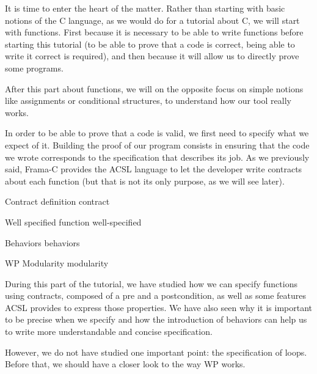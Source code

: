 It is time to enter the heart of the matter. Rather than starting with
basic notions of the C language, as we would do for a tutorial about C,
we will start with functions. First because it is necessary to be able
to write functions before starting this tutorial (to be able to prove
that a code is correct, being able to write it correct is required), and
then because it will allow us to directly prove some programs.



After this part about functions, we will on the opposite focus on simple
notions like assignments or conditional structures, to understand how our
tool really works.



In order to be able to prove that a code is valid, we first need to
specify what we expect of it. Building the proof of our program consists
in ensuring that the code we wrote corresponds to the specification that
describes its job. As we previously said, Frama-C provides the ACSL
language to let the developer write contracts about each function (but
that is not its only purpose, as we will see later).



\begin{levelTwo}
  {Contract definition}
  {contract}
\end{levelTwo}

\begin{levelTwo}
  {Well specified function}
  {well-specified}
\end{levelTwo}

\begin{levelTwo}
  {Behaviors}
  {behaviors}
\end{levelTwo}

\begin{levelTwo}
  {WP Modularity}
  {modularity}
\end{levelTwo}


\horizontalLine
\newpage


During this part of the tutorial, we have studied how we can specify
functions using contracts, composed of a pre and a postcondition, as
well as some features ACSL provides to express those properties. We have
also seen why it is important to be precise when we specify and how the
introduction of behaviors can help us to write more understandable and
concise specification.

However, we do not have studied one important point: the specification
of loops. Before that, we should have a closer look to the way WP works.

